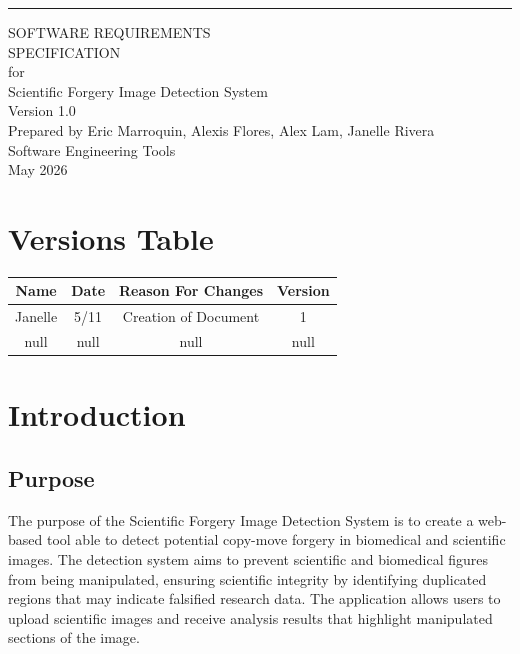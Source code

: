 \documentclass{scrreprt}
\date{}
\def\myversion{1.0 }
\begin{document}
\begin{flushright}
    \rule{16cm}{5pt}\vskip1cm
    \begin{bfseries}
        \Huge{SOFTWARE REQUIREMENTS\\ SPECIFICATION}\\
        \vspace{1.9cm}
        for\\
        \vspace{1.9cm}
        Scientific Forgery Image Detection System\\
        \vspace{1.9cm}
        \LARGE{Version \myversion }\\
        \vspace{1.9cm}
        Prepared by Eric Marroquin, Alexis Flores, Alex Lam, Janelle Rivera\\
        \vspace{1.9cm}
        Software Engineering Tools\\
        \vspace{0.2cm}
        May 2026\\
    \end{bfseries}
\end{flushright}

\tableofcontents


\chapter*{Versions Table}

\begin{center}
    \begin{tabular}{|c|c|c|c|}
        \hline
	    Name & Date & Reason For Changes & Version\\
        \hline
	    Janelle & 5/11 & Creation of Document & 1\\
        \hline
	    null & null & null & null\\
        \hline
    \end{tabular}
\end{center}

\chapter{Introduction}

\section{Purpose}
The purpose of the Scientific Forgery Image Detection System is to create a web-based tool able to detect potential copy-move forgery in biomedical and scientific images. The detection system aims to prevent scientific and biomedical figures from being manipulated, ensuring scientific integrity by identifying duplicated regions that may indicate falsified research data. The application allows users to upload scientific images and receive analysis results that highlight manipulated sections of the image.
\end{document}
